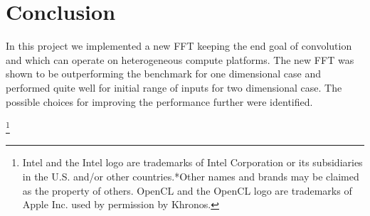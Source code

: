 \documentclass[sigconf]{acmart}
\begin{document}
\section{Conclusion}
In this project we implemented a new FFT keeping the end goal of convolution and which can operate on heterogeneous compute platforms. The new FFT was shown to be outperforming the benchmark for one dimensional case and performed quite well for initial range of inputs for two dimensional case. The possible choices for improving the performance further were identified.



\let\thefootnote\relax\footnote{Intel and the Intel logo are trademarks of Intel Corporation or its subsidiaries in the U.S. and/or other countries.*Other names and brands may be claimed as the property of others. OpenCL and the OpenCL logo are trademarks of Apple Inc. used by permission by Khronos.}  
	

 
\end{document}
